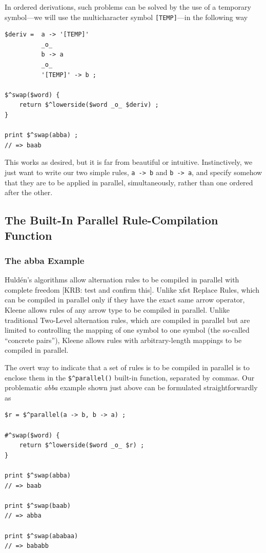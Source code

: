 In ordered derivations, such problems can be solved by the use of a temporary symbol---we
will use the multicharacter symbol \verb![TEMP]!---in the following way


\begin{Verbatim}
$deriv =  a -> '[TEMP]'
          _o_
          b -> a
          _o_
          '[TEMP]' -> b ;

$^swap($word) {
    return $^lowerside($word _o_ $deriv) ;
}

print $^swap(abba) ;
// => baab
\end{Verbatim}

\noindent
This works as desired, but it is far from beautiful or intuitive.  
Instinctively, we just want to write our two
simple rules, \verb!a -> b! and \verb!b -> a!, and specify somehow that they are to be
applied in parallel, simultaneously, rather than one ordered after the other. 

\newcommand{\dollar}{\char'44}

\subsection{The Built-In Parallel Rule-Compilation Function}

\subsubsection{The abba Example}

Huld\'en's algorithms allow alternation rules to be compiled in parallel with complete freedom [KRB:  test and confirm
this].  Unlike xfst Replace Rules, which can be compiled in parallel only if they have the exact same arrow operator,
Kleene allows rules of any arrow type to be compiled in parallel.  Unlike traditional Two-Level alternation rules, which are
compiled in parallel but are
limited to controlling the mapping of one symbol to one symbol (the so-called ``concrete pairs''), Kleene allows
rules with arbitrary-length mappings to be compiled in parallel.

The overt way to indicate that a set of rules is to be compiled in parallel is to enclose them in the \verb!$^parallel()!
built-in function, separated by commas.  Our problematic \emph{abba} example shown just above
can be formulated straightforwardly as

\begin{Verbatim}
$r = $^parallel(a -> b, b -> a) ;

#^swap($word) {
    return $^lowerside($word _o_ $r) ;
}

print $^swap(abba)
// => baab

print $^swap(baab)
// => abba

print $^swap(ababaa)
// => bababb
\end{Verbatim}

